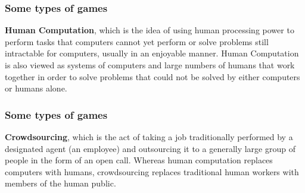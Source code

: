 \documentclass{beamer}
\begin{document}
\begin{frame}
\frametitle{Some types of games}
\textbf{Human Computation}, which is the idea of using human processing power to perform tasks that computers cannot yet perform or solve problems still intractable for computers, usually in an enjoyable manner. Human Computation is also viewed as systems of computers and large numbers of humans that work together in order to solve problems that could not be solved by either computers or humans alone.
\end{frame}
\begin{frame}
\frametitle{Some types of games}
\textbf{Crowdsourcing}, which is the act of taking a job traditionally performed by a designated agent (an employee) and outsourcing it to a generally large group of people in the form of an open call. Whereas human computation replaces computers with humans, crowdsourcing replaces traditional human workers with members of the human public.
\end{frame}
\end{document}
